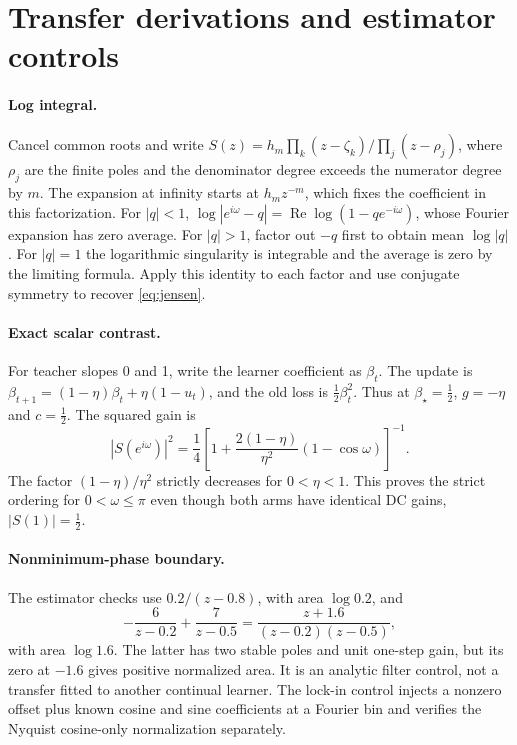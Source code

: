 \section{Transfer derivations and estimator controls}
\label{app:proof}

\paragraph{Log integral.}
Cancel common roots and write \(S(z)=h_m\prod_k(z-\zeta_k)/\prod_j(z-\rho_j)\), where \(\rho_j\) are the finite poles and the denominator degree exceeds the numerator degree by \(m\). The expansion at infinity starts at \(h_m z^{-m}\), which fixes the coefficient in this factorization. For \(|q|<1\), \(\log|e^{i\omega}-q|=\operatorname{Re}\log(1-q e^{-i\omega})\), whose Fourier expansion has zero average. For \(|q|>1\), factor out \(-q\) first to obtain mean \(\log|q|\). For \(|q|=1\) the logarithmic singularity is integrable and the average is zero by the limiting formula. Apply this identity to each factor and use conjugate symmetry to recover \cref{eq:jensen}.

\paragraph{Exact scalar contrast.}
For teacher slopes 0 and 1, write the learner coefficient as \(\beta_t\). The update is \(\beta_{t+1}=(1-\eta)\beta_t+\eta(1-u_t)\), and the old loss is \(\tfrac12\beta_t^2\). Thus at \(\beta_\star=\tfrac12\), \(g=-\eta\) and \(c=\tfrac12\). The squared gain is
\[
  |S(e^{i\omega})|^2 =
  \frac{1}{4}\left[1+\frac{2(1-\eta)}{\eta^2}(1-\cos\omega)\right]^{-1}.
\]
The factor \((1-\eta)/\eta^2\) strictly decreases for \(0<\eta<1\). This proves the strict ordering for \(0<\omega\leq\pi\) even though both arms have identical DC gains, \(\lvert S(1)\rvert=\tfrac12\).

\paragraph{Nonminimum-phase boundary.}
The estimator checks use \(0.2/(z-0.8)\), with area \(\log 0.2\), and
\[
  -\frac{6}{z-0.2}+\frac{7}{z-0.5}
    =\frac{z+1.6}{(z-0.2)(z-0.5)},
\]
with area \(\log 1.6\). The latter has two stable poles and unit one-step gain, but its zero at \(-1.6\) gives positive normalized area. It is an analytic filter control, not a transfer fitted to another continual learner. The lock-in control injects a nonzero offset plus known cosine and sine coefficients at a Fourier bin and verifies the Nyquist cosine-only normalization separately.

